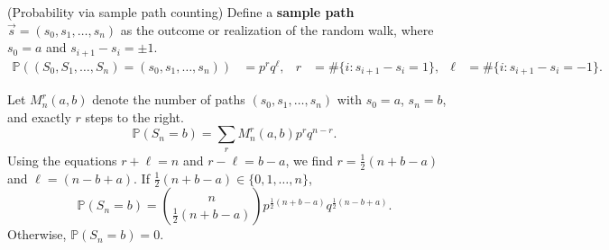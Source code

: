 \documentclass{huhtakm-template-book}
\newcommand{\prob}{\mathbb{P}}
\begin{document}
    \begin{eg}(Probability via sample path counting)
        Define a \textbf{sample path} $\vec{s}=(s_{0},s_{1},\dots,s_{n})$ as the outcome or realization of the random walk, where $s_{0}=a$ and $s_{i+1}-s_{i}=\pm 1$.
        \begin{align*}
            \prob((S_{0},S_{1},\dots,S_{n})=(s_{0},s_{1},\dots,s_{n}))&=p^{r}q^{\ell}, & r&=\#\{i:s_{i+1}-s_{i}=1\}, & \ell&=\#\{i:s_{i+1}-s_{i}=-1\}.
        \end{align*}
    \end{eg}
    \begin{eg}
        Let $M_{n}^{r}(a,b)$ denote the number of paths $(s_{0},s_{1},\dots,s_{n})$ with $s_{0}=a$, $s_{n}=b$, and exactly $r$ steps to the right.
        \begin{equation*}
            \prob(S_{n}=b)=\sum_{r} M_{n}^{r}(a,b)p^{r}q^{n-r}.
        \end{equation*}
        Using the equations $r+\ell=n$ and $r-\ell=b-a$, we find $r=\frac{1}{2}(n+b-a)$ and $\ell=(n-b+a)$. If $\frac{1}{2}(n+b-a)\in\{0,1,\dots,n\}$,
        \begin{equation*}
            \prob(S_{n}=b)=\binom{n}{\frac{1}{2}(n+b-a)}p^{\frac{1}{2}(n+b-a)}q^{\frac{1}{2}(n-b+a)}.
        \end{equation*}
        Otherwise, $\prob(S_{n}=b)=0$.
    \end{eg}
    
\end{document}
